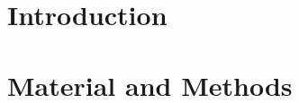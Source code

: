 \documentclass[english,b5paper,11pt]{scrbook} %
\begin{document}
\begin{titlepage}
  \fancyhf{}
\end{titlepage}
\newpage
\pagestyle{plain}
{}
\newpage
\tableofcontents
\label{tableofcontents}
\begin{titlepage}
  \fancyhf{}
\end{titlepage}
\begin{titlepage}
  \fancyhf{}
\end{titlepage}
 \label{listoffig}
\listoffigures

\begin{titlepage}
  \fancyhf{}
\end{titlepage}
 \label{listoftables}
\listoftables





\begin{titlepage}
  \fancyhf{}
\end{titlepage}





\chapter{Introduction} 
\label{intro}


\chapter{Material and Methods} 
\label{matmet}




\end{document}
